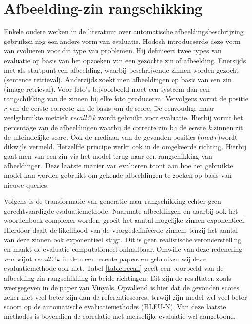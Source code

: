 \section{Afbeelding-zin rangschikking}
Enkele oudere werken in de literatuur over automatische afbeeldingsbeschrijving gebruiken nog een andere vorm van evaluatie. Hodosh introduceerde deze vorm van evolueren voor dit type van problemen.\cite{Hodosh2013} Hij defini\"eert twee types van evaluatie op basis van het opzoeken van een gezochte zin of afbeelding. Enerzijds met als startpunt een afbeelding, waarbij beschrijvende zinnen worden gezocht (sentence retrieval). Anderzijds zoekt men afbeeldingen op basis van een zin (image retrieval). Voor foto's bijvoorbeeld moet een systeem dan een rangschikking van de zinnen bij elke foto produceren. Vervolgens vormt de positie $r$ van de eerste correcte zin de basis van de score. De eenvoudige maar veelgebruikte metriek $recall @ k$ wordt gebruikt voor evaluatie. Hierbij vormt het percentage van de afbeeldingen waarbij de correcte zin bij de eerste $k$ zinnen zit de uiteindelijke score. Ook de mediaan van de gevonden posities ($med\: r$)wordt dikwijls vermeld. Hetzelfde principe werkt ook in de omgekeerde richting. Hierbij gaat men van een zin via het model terug naar een rangschikking van afbeeldingen. Deze laatste manier van evalueren toont aan hoe het gebruikte model kan worden gebruikt om gekende afbeeldingen te zoeken op basis van nieuwe queries. 

Volgens \cite{Google} is de transformatie van generatie naar rangschikking echter geen gerechtvaardigde evaluatiemethode. Naarmate afbeeldingen en daarbij ook het woordenboek complexer worden, groeit het aantal mogelijke zinnen exponentieel. Hierdoor daalt de likelihood van de voorgedefin\"ieerde zinnen, tenzij het aantal van deze zinnen ook exponentieel stijgt. Dit is geen realistische veronderstelling en maakt de evaluatie computationeel onhaalbaar. Omwille van deze redenering verdwijnt $recall @ k$ in de meer recente papers en gebruiken wij deze evaluatiemethode ook niet. Tabel \ref{table:recall} geeft een voorbeeld van de afbeelding-zin rangschikking in beide richtingen. Dit zijn de resultaten zoals weergegeven in de paper van Vinyals. Opvallend is hier dat de gevonden scores zeker niet veel beter zijn dan de referentiescores, terwijl zijn model wel veel beter scoort op de automatische evaluatiemethodes (BLEU-N). Van deze laatste methodes is bovendien de correlatie met menselijke evaluatie wel aangetoond.


